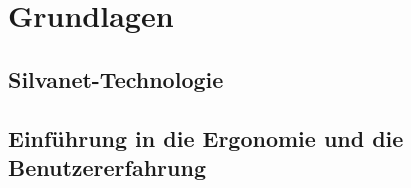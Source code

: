 \chapter{Grundlagen}
\section{Silvanet-Technologie}



\section{Einführung in die Ergonomie und die Benutzererfahrung}
